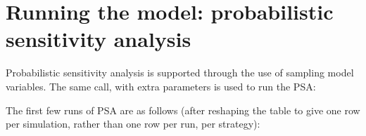 \documentclass[
]{article}
\newenvironment{Shaded}{\begin{snugshade}}{\end{snugshade}}
\newcommand{\AttributeTok}[1]{\textcolor[rgb]{0.77,0.63,0.00}{#1}}
\newcommand{\DecValTok}[1]{\textcolor[rgb]{0.00,0.00,0.81}{#1}}
\newcommand{\FunctionTok}[1]{\textcolor[rgb]{0.00,0.00,0.00}{#1}}
\newcommand{\NormalTok}[1]{#1}
\newcommand{\OtherTok}[1]{\textcolor[rgb]{0.56,0.35,0.01}{#1}}
\newcommand{\SpecialCharTok}[1]{\textcolor[rgb]{0.00,0.00,0.00}{#1}}
\begin{document}
\hypertarget{running-the-model-probabilistic-sensitivity-analysis}{%
\section{Running the model: probabilistic sensitivity
analysis}\label{running-the-model-probabilistic-sensitivity-analysis}}

Probabilistic sensitivity analysis is supported through the use of
sampling model variables. The same call, with extra parameters is used
to run the PSA:

\begin{Shaded}
\end{Shaded}

The first few runs of PSA are as follows (after reshaping the table to
give one row per simulation, rather than one row per run, per strategy):
\end{document}
